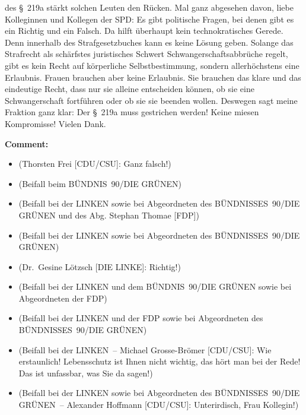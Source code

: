 \documentclass{article}
\begin{document}
des § 219a stärkt solchen Leuten den Rücken. Mal ganz abgesehen davon, liebe Kolleginnen und Kollegen der SPD: Es gibt politische Fragen, bei denen gibt es ein Richtig und ein Falsch. Da hilft überhaupt kein technokratisches Gerede. Denn innerhalb des Strafgesetzbuches kann es keine Lösung geben. Solange das Strafrecht als schärfstes juristisches Schwert Schwangerschaftsabbrüche regelt, gibt es kein Recht auf körperliche Selbstbestimmung, sondern allerhöchstens eine Erlaubnis. Frauen brauchen aber keine Erlaubnis. Sie brauchen das klare und das eindeutige Recht, dass nur sie alleine entscheiden können, ob sie eine Schwangerschaft fortführen oder ob sie sie beenden wollen.  Deswegen sagt meine Fraktion ganz klar: Der § 219a muss gestrichen werden! Keine miesen Kompromisse! Vielen Dank.  

\noindent\textbf{Comment:}
\begin{itemize}
    \setlength\itemsep{-3pt}
    \item (Thorsten Frei [CDU/CSU]: Ganz falsch!)
    \setlength\itemsep{-3pt}
    \item (Beifall beim BÜNDNIS 90/DIE GRÜNEN)
    \setlength\itemsep{-3pt}
    \item (Beifall bei der LINKEN sowie bei Abgeordneten des BÜNDNISSES 90/DIE GRÜNEN und des Abg. Stephan Thomae [FDP])
    \setlength\itemsep{-3pt}
    \item (Beifall bei der LINKEN sowie bei Abgeordneten des BÜNDNISSES 90/DIE GRÜNEN)
    \setlength\itemsep{-3pt}
    \item (Dr. Gesine Lötzsch [DIE LINKE]: Richtig!)
    \setlength\itemsep{-3pt}
    \item (Beifall bei der LINKEN und dem BÜNDNIS 90/DIE GRÜNEN sowie bei Abgeordneten der FDP)
    \setlength\itemsep{-3pt}
    \item (Beifall bei der LINKEN und der FDP sowie bei Abgeordneten des BÜNDNISSES 90/DIE GRÜNEN)
    \setlength\itemsep{-3pt}
    \item (Beifall bei der LINKEN – Michael Grosse-­Brömer [CDU/CSU]: Wie erstaunlich! Lebensschutz ist Ihnen nicht wichtig, das hört man bei der Rede! Das ist unfassbar, was Sie da sagen!)
    \setlength\itemsep{-3pt}
    \item (Beifall bei der LINKEN sowie bei Abgeordneten des BÜNDNISSES 90/DIE GRÜNEN – Alexander Hoffmann [CDU/CSU]: Unterirdisch, Frau Kollegin!)
\end{itemize}
\end{document}

